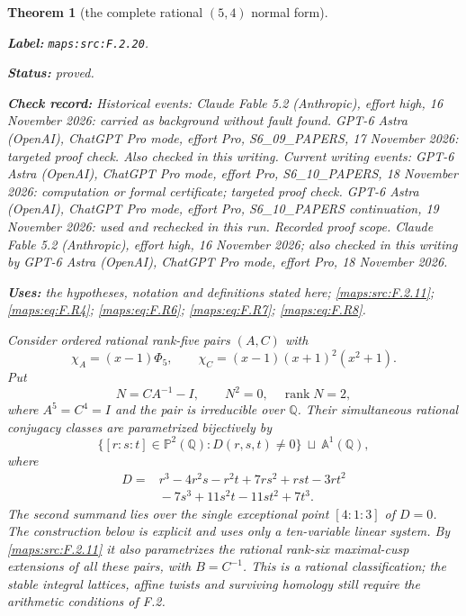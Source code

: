 \documentclass[11pt,a4paper]{article}
\newtheorem{theorem}{Theorem}[section]
\theoremstyle{definition}
\newcommand{\StatementRecord}[4]{\par\smallskip\begingroup\upshape\raggedright\noindent\textbf{Label:} \nolinkurl{#1}.\par\noindent\textbf{Status:} #2.\par\noindent\textbf{Check record:} #3.\par\noindent\textbf{Uses:} #4.\par\endgroup\smallskip}
\begin{document}
\begin{theorem}[the complete rational $(5,4)$ normal form]\label{maps:src:F.2.20}
\StatementRecord{maps:src:F.2.20}{proved}{Historical events: Claude Fable 5.2 (Anthropic), effort high, 16 November 2026: carried as background without fault found. GPT-6 Astra (OpenAI), ChatGPT Pro mode, effort Pro, S6\_09\_PAPERS, 17 November 2026: targeted proof check. Also checked in this writing. Current writing events: GPT-6 Astra (OpenAI), ChatGPT Pro mode, effort Pro, S6\_10\_PAPERS, 18 November 2026: computation or formal certificate; targeted proof check. GPT-6 Astra (OpenAI), ChatGPT Pro mode, effort Pro, S6\_10\_PAPERS continuation, 19 November 2026: used and rechecked in this run. \emph{Recorded proof scope.} Claude Fable 5.2 (Anthropic), effort high, 16 November 2026; also checked in this writing by GPT-6 Astra (OpenAI), ChatGPT Pro mode, effort Pro, 18 November 2026}{the hypotheses, notation and definitions stated here; \cref{maps:src:F.2.11}; \cref{maps:eq:F.R4}; \cref{maps:eq:F.R6}; \cref{maps:eq:F.R7}; \cref{maps:eq:F.R8}}


Consider ordered rational rank-five pairs $(A,C)$ with
\[
 \chi_A=(x-1)\Phi_5,
 \qquad \chi_C=(x-1)(x+1)^2(x^2+1).
\]
Put
\[
 N=CA^{-1}-I,
 \qquad N^2=0,\quad\operatorname{rank}N=2,
\]
where $A^5=C^4=I$ and the pair is irreducible over $\mathbb Q$.
Their simultaneous rational conjugacy classes are parametrized
bijectively by
\[
 \bigl\{[r:s:t]\in\mathbb P^2(\mathbb Q):D(r,s,t)\ne0\bigr\}
 \ \sqcup\ \mathbb A^1(\mathbb Q),
 \tag{F.R1}\label{maps:eq:F.R1}
\]
where
\[
\begin{split}
 D={}&r^3-4r^2s-r^2t+7rs^2+rst-3rt^2\\
     &{}-7s^3+11s^2t-11st^2+7t^3.
\end{split}
 \tag{F.R2}\label{maps:eq:F.R2}
\]
The second summand lies over the single exceptional point
$[4:1:3]$ of $D=0$.  The construction below is explicit and
uses only a ten-variable linear system.  By \ref{maps:src:F.2.11} it also
parametrizes the rational rank-six maximal-cusp extensions
of all these pairs, with $B=C^{-1}$.
This is a rational classification; the stable integral
lattices, affine twists and surviving homology still require
the arithmetic conditions of F.2.

\end{theorem}
\end{document}
